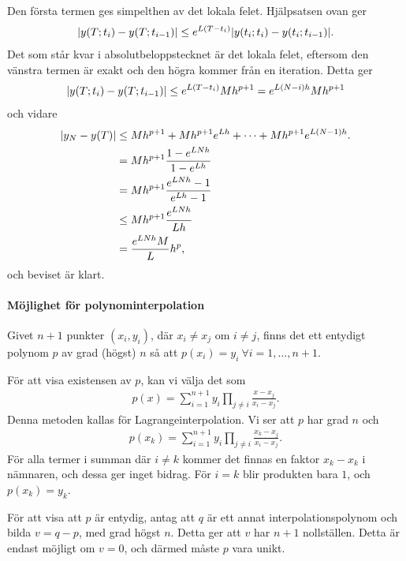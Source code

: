 Den första termen ges simpelthen av det lokala felet. Hjälpsatsen ovan ger
\begin{align*}
	\abs{y(T; t_{i}) - y(T; t_{i - 1})} \leq e^{L(T - t_{i})}\abs{y(t_{i}; t_{i}) - y(t_{i}; t_{i - 1})}.
\end{align*}
Det som står kvar i absolutbeloppstecknet är det lokala felet, eftersom den vänstra termen är exakt och den högra kommer från en iteration. Detta ger
\begin{align*}
	\abs{y(T; t_{i}) - y(T; t_{i - 1})} \leq e^{L(T - t_{i})}Mh^{p + 1} = e^{L(N - i)h}Mh^{p + 1}
\end{align*}
och vidare
\begin{align*}
	\abs{y_{N} - y(T)} &\leq Mh^{p + 1} + Mh^{p + 1}e^{Lh} + \dots + Mh^{p + 1}e^{L(N - 1)h}. \\
	                   &= Mh^{p + 1}\frac{1 - e^{LNh}}{1 - e^{Lh}} \\
	                   &= Mh^{p + 1}\frac{e^{LNh} - 1}{e^{Lh} - 1} \\
	                   &\leq Mh^{p + 1}\frac{e^{LNh}}{Lh} \\
	                   &= \frac{e^{LNh}M}{L}h^{p},
\end{align*}
och beviset är klart.

\paragraph{Möjlighet för polynominterpolation}
Givet $n + 1$ punkter $(x_{i}, y_{i})$, där $x_{i}\neq x_{j}$ om $i\neq j$, finns det ett entydigt polynom $p$ av grad (högst) $n$ så att $p(x_{i}) = y_{i}\ \forall i= 1, \dots, n + 1$.

\proof
För att visa existensen av $p$, kan vi välja det som
\begin{align*}
	p(x) = \sum\limits_{i = 1}^{n + 1}y_{i}\prod\limits_{j\neq i}\frac{x - x_{j}}{x_{i} - x_{j}}.
\end{align*}
Denna metoden kallas för Lagrangeinterpolation. Vi ser att $p$ har grad $n$ och
\begin{align*}
	p(x_{k}) = \sum\limits_{i = 1}^{n + 1}y_{i}\prod\limits_{j\neq i}\frac{x_{k} - x_{j}}{x_{i} - x_{j}}.
\end{align*}
För alla termer i summan där $i\neq k$ kommer det finnas en faktor $x_{k} - x_{k}$ i nämnaren, och dessa ger inget bidrag. För $i = k$ blir produkten bara $1$, och $p(x_{k}) = y_{k}$.

För att visa att $p$ är entydig, antag att $q$ är ett annat interpolationspolynom och bilda $v = q - p$, med grad högst $n$. Detta ger att $v$ har $n + 1$ nollställen. Detta är endast möjligt om $v = 0$, och därmed måste $p$ vara unikt.

